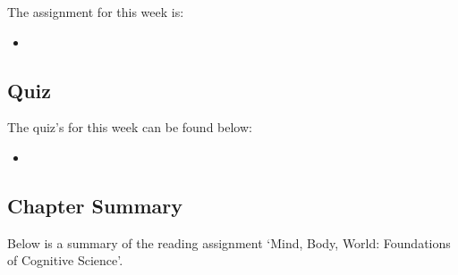 The assignment for this week is:

\begin{itemize}
    \item {}
\end{itemize}

\subsection{Quiz}

The quiz's for this week can be found below:

\begin{itemize}
    \item {}
\end{itemize}

\subsection{Chapter Summary}

Below is a summary of the reading assignment `Mind, Body, World: Foundations of Cognitive Science'.

